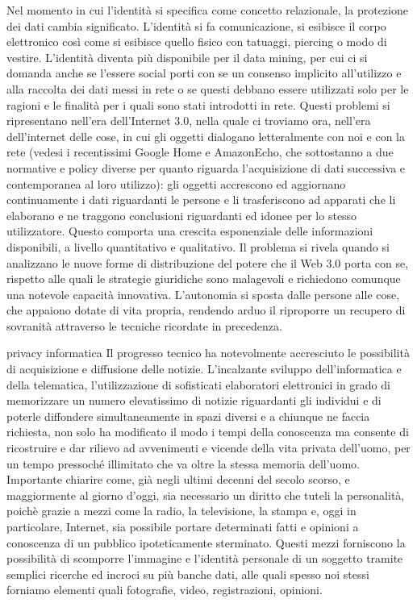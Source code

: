 Nel momento in cui l’identità si specifica come concetto relazionale, la protezione dei dati cambia significato. L’identità si fa comunicazione, si esibisce il corpo elettronico così come si esibisce quello fisico con tatuaggi, piercing o modo di vestire. L’identità diventa più disponibile per il data mining, per cui ci si domanda anche se l’essere social porti con se un consenso implicito all’utilizzo e alla raccolta dei dati messi in rete o se questi debbano essere utilizzati solo per le ragioni e le finalità per i quali sono stati introdotti in rete. Questi problemi si ripresentano nell’era dell’Internet 3.0, nella quale ci troviamo ora, nell’era dell’internet delle cose, in cui gli oggetti dialogano letteralmente con noi e con la rete (vedesi i recentissimi Google Home e AmazonEcho, che sottostanno a due normative e policy diverse per quanto riguarda l’acquisizione di dati successiva e contemporanea al loro utilizzo): gli oggetti accrescono ed aggiornano continuamente i dati riguardanti le persone e li trasferiscono ad apparati che li elaborano e ne traggono conclusioni riguardanti ed idonee per lo stesso utilizzatore.
Questo comporta una crescita esponenziale delle informazioni disponibili, a livello quantitativo e qualitativo. Il problema si rivela quando si analizzano le nuove forme di distribuzione del potere che il Web 3.0 porta con se, rispetto alle quali le strategie giuridiche sono malagevoli e richiedono comunque una notevole capacità innovativa. L’autonomia si sposta dalle persone alle cose, che appaiono dotate di vita propria, rendendo arduo il riproporre un recupero di sovranità attraverso le tecniche ricordate in precedenza.

{privacy informatica}
Il progresso tecnico ha notevolmente accresciuto le possibilità di acquisizione e diffusione delle notizie. L'incalzante sviluppo dell'informatica e della telematica, l'utilizzazione di sofisticati elaboratori elettronici in grado di memorizzare un numero elevatissimo di notizie riguardanti gli individui e di poterle diffondere simultaneamente in spazi diversi e a chiunque ne faccia richiesta, non solo ha modificato il modo i tempi della conoscenza ma consente di ricostruire e dar rilievo ad avvenimenti e vicende della vita privata dell'uomo, per un tempo pressoché illimitato che va oltre la stessa memoria dell'uomo.
Importante chiarire come, già negli ultimi decenni del secolo scorso, e maggiormente al giorno d'oggi, sia necessario un diritto che tuteli la personalità, poichè grazie a mezzi come la radio, la televisione, la stampa e, oggi in particolare, Internet, sia possibile portare determinati fatti e opinioni a conoscenza di un pubblico ipoteticamente sterminato. Questi mezzi forniscono la possibilità di scomporre l'immagine e l'identità personale di un soggetto tramite semplici ricerche ed incroci su più banche dati, alle quali spesso noi stessi forniamo elementi quali fotografie, video, registrazioni, opinioni.


